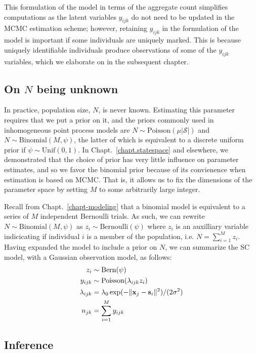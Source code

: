 This formulation of the model in terms of the aggregate count
simplifies computations as the latent variables
$y_{ijk}$ do not need to be updated in the MCMC estimation
scheme; however, retaining $y_{ijk}$ in the formulation of the model
is important if some individuals are uniquely marked. %
This is because
uniquely identifiable individuals produce
observations of some of the $y_{ijk}$ variables, which we elaborate
on in the subsequent chapter.

\subsection{On $N$ being unknown}

In practice, population size, $N$, is never known. Estimating this %
parameter requires that we put a prior on it, and the priors commonly
used in inhomogeneous point process models are
$N \sim \text{Poisson}(\mu|\mathcal{S}|)$ and
$N \sim \text{Binomial}(M, \psi)$, the latter of which is equivalent
to a discrete uniform prior if $\psi \sim \text{Unif}(0,1)$. In
Chapt.~\ref{chapt.statespace} and elsewhere, we demonstrated that
the choice of prior has very little influence on parameter estimates,
and so we favor the binomial prior because of its convienence when
estimation is based on MCMC. That is, it allows us to fix the
dimensions of the parameter space by setting $M$ to some arbitrarily
large integer.

Recall from Chapt.~\ref{chapt-modeling} that a binomial model is
equivalent to a series of $M$ independent Bernoulli trials. As such,
we can rewrite $N \sim \text{Binomial}(M, \psi)$ as $z_i \sim
\text{Bernoulli}(\psi)$ where $z_i$ is an auxilliary variable
indicicating if individual $i$ is a member of the population, i.e. $N =
\sum_{i=1}^M z_i$. Having expanded the model to include a prior on $N$, we
can summarize the SC model, with a Gaussian observation model, as follows:
\begin{align*}
  z_i &\sim \text{Bern}(\psi) \\
  y_{ijk} &\sim \text{Poisson}(\lambda_{ijk} z_i) \\
  \lambda_{ijk} &= \lambda_0\exp(-\|{\bf x}_j - {\bf s}_i\|^2)/(2\sigma^2) \\
  n_{jk} &= \sum_{i=1}^M y_{ijk} %
\end{align*}



\subsection{Inference}

